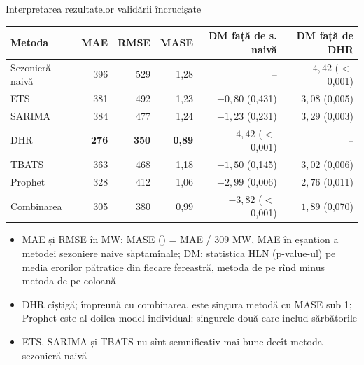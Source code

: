 \begin{frame}{Interpretarea rezultatelor validării încrucișate}
\itemsize{\footnotesize}
\begin{center}
\scriptsize
\begin{tabular}{lrrrrr}
\toprule
\textbf{Metoda} & \textbf{MAE} & \textbf{RMSE} & \textbf{MASE} & \textbf{DM față de s. naivă} & \textbf{DM față de DHR} \\
\midrule
Sezonieră naivă & 396 & 529 & 1{,}28 & -- & $4{,}42$ ($<$\,0{,}001) \\
ETS & 381 & 492 & 1{,}23 & $\ensuremath{-}0{,}80$ (0{,}431) & $3{,}08$ (0{,}005) \\
SARIMA & 384 & 477 & 1{,}24 & $\ensuremath{-}1{,}23$ (0{,}231) & $3{,}29$ (0{,}003) \\
DHR & \textbf{276} & \textbf{350} & \textbf{0{,}89} & $\ensuremath{-}4{,}42$ ($<$\,0{,}001) & -- \\
TBATS & 363 & 468 & 1{,}18 & $\ensuremath{-}1{,}50$ (0{,}145) & $3{,}02$ (0{,}006) \\
Prophet & 328 & 412 & 1{,}06 & $\ensuremath{-}2{,}99$ (0{,}006) & $2{,}76$ (0{,}011) \\
Combinarea & 305 & 380 & 0{,}99 & $\ensuremath{-}3{,}82$ ($<$\,0{,}001) & $1{,}89$ (0{,}070) \\
\bottomrule
\end{tabular}
\end{center}
\begin{itemize}
    \item MAE și RMSE în MW; MASE () = MAE / 309 MW, MAE în eșantion a metodei sezoniere naive săptămînale; DM: statistica HLN (p-value-ul) pe media erorilor pătratice din fiecare fereastră, metoda de pe rînd minus metoda de pe coloană
    \item DHR cîștigă; împreună cu combinarea, este singura metodă cu MASE sub 1; Prophet este al doilea model individual: singurele două care includ sărbătorile
    \item ETS, SARIMA și TBATS nu sînt semnificativ mai bune decît metoda sezonieră naivă
\end{itemize}
\end{frame}

